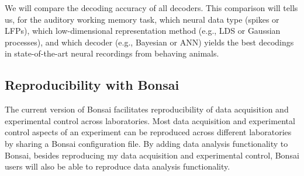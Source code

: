 \documentclass[a4paper,11point]{article}
\begin{document}
We will compare the decoding accuracy of all decoders. This comparison will
tells us, for the auditory working memory task, which neural data type (spikes
or LFPs), which low-dimensional representation method (e.g., LDS or Gaussian
processes), and which decoder (e.g., Bayesian or ANN) yields the best decodings
in state-of-the-art neural recordings from behaving animals.

\subsection{Reproducibility with Bonsai}
\label{sec:reproducibility}

The current version of Bonsai facilitates reproducibility of data acquisition
and experimental control across laboratories. Most data acquisition and
experimental control aspects of an experiment can be reproduced across
different laboratories by sharing a Bonsai configuration file.
%
By adding data analysis functionality to Bonsai, besides reproducing my data
acquisition and experimental control, Bonsai users will also be able to reproduce
data analysis functionality.
\end{document}
